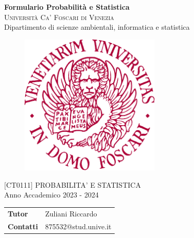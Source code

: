 \begin{titlepage}
    \vspace*{1 cm}
    \begin{center}
         {\LARGE \textbf{Formulario Probabilità e Statistica}\\}
        \vspace{2 cm}
        \textsc{Università Ca' Foscari di Venezia}\\
        Dipartimento di scienze ambientali, informatica e statistica\\
        \vspace{0.2 cm}
        \begin{figure}[h!]
        	\centering
        	\includegraphics[width=0.6\textwidth]{logo} 
        \end{figure}
        \vspace{0.0 cm} [CT0111] PROBABILITA' E STATISTICA\\
        Anno Accademico 2023 - 2024\\
        \vspace{3.0 cm}
        	
        \begin{flushleft}
        	\begin{tabular}{l l}
        		\textbf{Tutor} & Zuliani Riccardo \\
                \textbf{Contatti} & 875532@stud.unive.it
        	\end{tabular}
        \end{flushleft}
    \end{center}
\end{titlepage}
